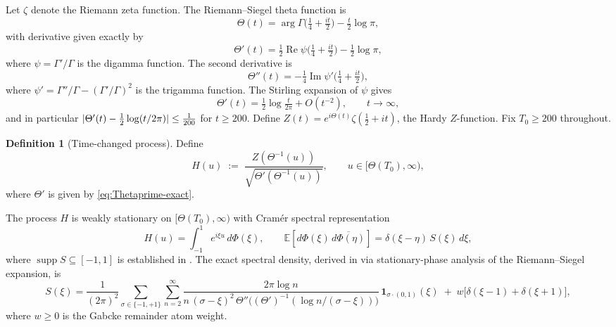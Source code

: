 \documentclass[11pt,reqno]{amsart}
\theoremstyle{definition}
\newtheorem{definition}[theorem]{Definition}
\theoremstyle{remark}
\DeclareMathOperator{\supp}{supp}
\DeclarePairedDelimiter{\abs}{\lvert}{\rvert}
\begin{document}
Let \(\zeta\) denote the Riemann zeta function. The Riemann--Siegel
theta function is
\begin{equation}\label{eq:Thetadef}
  \Theta(t) = \arg\Gamma\!\bigl(\tfrac{1}{4}+\tfrac{it}{2}\bigr)
              - \tfrac{t}{2}\log\pi,
\end{equation}
with derivative given exactly by
\begin{equation}\label{eq:Thetaprime-exact}
  \Theta'(t) = \tfrac{1}{2}\operatorname{Re}\psi\!\bigl(\tfrac{1}{4}+\tfrac{it}{2}\bigr)
               - \tfrac{1}{2}\log\pi,
\end{equation}
where \(\psi = \Gamma'/\Gamma\) is the digamma function. The second
derivative is
\begin{equation}\label{eq:Thetapp-exact}
  \Theta''(t) = -\tfrac{1}{4}\operatorname{Im}\psi'\!\bigl(\tfrac{1}{4}+\tfrac{it}{2}\bigr),
\end{equation}
where \(\psi' = \Gamma''/\Gamma - (\Gamma'/\Gamma)^2\) is the trigamma
function. The Stirling expansion of \(\psi\) gives
\begin{equation}\label{eq:Thetaprime-asymp}
  \Theta'(t) = \tfrac{1}{2}\log\tfrac{t}{2\pi} + O(t^{-2}),
  \qquad t \to \infty,
\end{equation}
and in particular \(\abs{\Theta'(t) - \tfrac{1}{2}\log(t/2\pi)} \le
\tfrac{1}{200}\) for \(t \ge 200\). Define \(Z(t) =
e^{i\Theta(t)}\zeta(\tfrac{1}{2}+it)\), the Hardy \(Z\)-function.
Fix \(T_0 \ge 200\) throughout.

\begin{definition}[Time-changed process]\label{def:H}
Define
\begin{equation}\label{eq:Hdef}
  H(u) \;:=\; \frac{Z(\Theta^{-1}(u))}{\sqrt{\Theta'(\Theta^{-1}(u))}},
  \qquad u \in [\Theta(T_0),\infty),
\end{equation}
where \(\Theta'\) is given by \eqref{eq:Thetaprime-exact}.
\end{definition}

The process \(H\) is weakly stationary on \([\Theta(T_0),\infty)\)
with Cram\'er spectral representation
\begin{equation}\label{eq:cramer}
  H(u) = \int_{-1}^{1} e^{i\xi u}\,d\Phi(\xi),
  \qquad
  \mathbb{E}\!\left[d\Phi(\xi)\,\overline{d\Phi(\eta)}\right]
  = \delta(\xi-\eta)\,S(\xi)\,d\xi,
\end{equation}
where \(\supp S \subseteq [-1,1]\) is established in
\cite{zetaSpectralMeasure}. The exact spectral density, derived in
\cite{HardyZV2} via stationary-phase analysis of the Riemann--Siegel
expansion, is
\begin{equation}\label{eq:Sdef}
  S(\xi) = \frac{1}{(2\pi)^2}
  \sum_{\sigma \in \{-1,+1\}}
  \sum_{n=2}^{\infty}
  \frac{2\pi \log n}
       {n\,(\sigma-\xi)^2\,\Theta''\!\bigl((\Theta')^{-1}(\log n/(\sigma-\xi))\bigr)}
  \,\mathbf{1}_{\sigma\cdot(0,1)}(\xi)
  \;+\; w\bigl[\delta(\xi-1)+\delta(\xi+1)\bigr],
\end{equation}
where \(w \ge 0\) is the Gabcke remainder atom weight.
\end{document}
